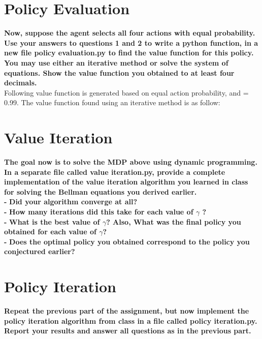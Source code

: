 \documentclass[11pt]{article}
\begin{document}
\section{Policy Evaluation}
\textbf{Now, suppose the agent selects all four actions with equal probability. Use your
answers to questions 1 and 2 to write a python function, in a new file policy
evaluation.py to find the value function for this policy. You may use either an
iterative method or solve the system of equations. Show the value function you
obtained to at least four decimals.}
\\


\noindent
Following value function is generated based on equal action probability, and  =
0.99. The value function found using an iterative method is as follow:
\\


\section{Value Iteration}
\textbf{The goal now is to solve the MDP above using dynamic programming. In a separate
file called value iteration.py, provide a complete implementation of the value
iteration algorithm you learned in class for solving the Bellman equations you
derived earlier.}
\\

\noindent
\textbf{-}
\noindent
\textbf{Did your algorithm converge at all?}
\\

\noindent
\textbf{-}
\noindent
\textbf{How many iterations did this take for each value of $\gamma$ ?}
\\

\noindent
\textbf{-}
\noindent
\textbf{What is the best value of $\gamma$? Also, What was the final policy you
obtained for each value of $\gamma$?}
\\

\noindent
\textbf{-}
\noindent
\textbf{Does the optimal policy you obtained correspond to the policy you
conjectured earlier?}
\\


\section{Policy Iteration}
\textbf{Repeat the previous part of the assignment, but now implement the policy
iteration algorithm from class in a file called policy iteration.py. Report your
results and answer all questions as in the previous part.}
\\
\end{document}
